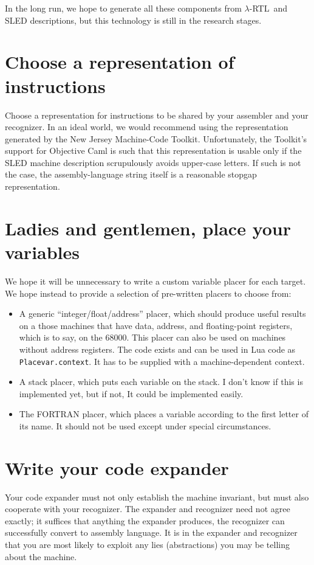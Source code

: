 \documentclass[12pt]{article}
\newcommand\lrtl{\mbox{$\lambda$-RTL}}
\begin{document}
In the long run,
we hope to generate all these components from \lrtl\ and SLED descriptions,
but this technology is still in the research stages.

\section{Choose a representation of instructions}

Choose a representation for instructions to be shared by your
assembler and your recognizer.
In an ideal world, 
we would recommend using the representation generated by the New Jersey
Machine-Code Toolkit. 
Unfortunately, the Toolkit's support for Objective Caml is such that
this representation is usable only if the SLED machine description
scrupulously avoids upper-case letters.
If such is not the case, the assembly-language string itself is a
reasonable stopgap representation.


\section{Ladies and gentlemen, place your variables} 


We hope it will be unnecessary to write a custom variable placer for
each target.
We hope instead to provide a selection of pre-written placers to
choose from:
\begin{itemize}
\item
A generic ``integer/float/address'' placer, which should produce useful
results on a those machines that have data, address, and 
floating-point registers, which is to say, on the 68000.
This placer can also be used on machines without address registers.
The code exists and can be used in Lua code as
\texttt{Placevar.context}. 
It has to be supplied with a machine-dependent context.
\item
A stack placer, which puts each variable on the stack.
I don't know if this is implemented yet, but if not, It could be
implemented easily.
\item
The FORTRAN placer, which places a variable according to the first
letter of its name.
It should not be used except under special circumstances.
\end{itemize}

\section{Write your code expander}

Your code expander must not only establish the machine invariant, but
must also cooperate with your recognizer.
The expander and recognizer need not agree exactly;
it suffices that anything the expander produces, the recognizer can
successfully convert to assembly language.
It is in the expander and recognizer that you are most likely to
exploit any lies (abstractions) you may be telling about the machine.
\end{document}
